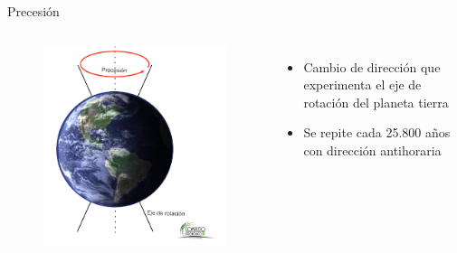 \documentclass{beamer}
\begin{document}
\begin{frame}{Precesión}
 \begin{columns}
  \begin{figure}
   \centering
   \includegraphics[scale=0.35]{Imagenes/Precesion_01}
  \end{figure}
 \small
 \justify
\begin{itemize}
\item Cambio de dirección que experimenta el eje de rotación del planeta tierra
\item Se repite cada 25.800 años con dirección antihoraria
\end{itemize}
 \end{columns}
\end{frame}
\end{document}
